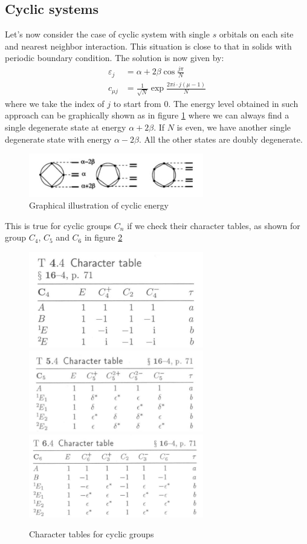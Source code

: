 \documentclass{article}
\begin{document}
\subsection{Cyclic systems}
Let's now consider the case of cyclic system with single $s$ orbitals on each site and nearest neighbor interaction. 
This situation is close to that in solids with periodic boundary condition. The solution is now given by:
\begin{align}
    \label{E:cyclic_system_energy}
    \varepsilon_j &= \alpha + 2 \beta \cos\frac{j\pi}{N} \\ 
    c_{\mu j} &= \frac{1}{\sqrt{N}} \exp \frac{2\pi i \cdot j (\mu-1)}{N} 
\end{align}
where we take the index of $j$ to start from 0. 
The energy level obtained in such approach can be graphically shown as in figure \ref{F:cyclic_energy} 
where we can always find a single degenerate state at energy $\alpha + 2 \beta$. If $N$ is even, we have 
another single degenerate state with energy $\alpha - 2 \beta$. All the other states are doubly degenerate. 
\begin{figure}[h!]
    \centering
    \includegraphics[width=3in]{F_cyclic_energy.png}
    \caption{Graphical illustration of cyclic energy}
    \label{F:cyclic_energy}
\end{figure}
This is true for cyclic groups $C_n$ if we check their character tables, as shown for group $C_4$, $C_5$ and 
$C_6$ in figure \ref{F_cyclic_group_table}

\begin{figure}[h!]
    \centering
    \includegraphics[width=3in]{F_C4.png}
    \includegraphics[width=3in]{F_C5.png}
    \includegraphics[width=3in]{F_C6.png}
    \caption{Character tables for cyclic groups}
    \label{F_cyclic_group_table}
\end{figure}
\end{document}
